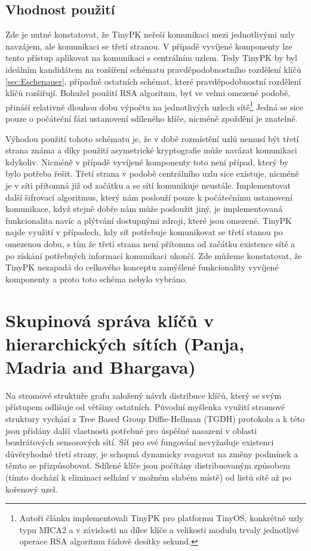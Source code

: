 \documentclass[11pt,final,twoside]{fithesis2}
\begin{document}
\subsection{Vhodnost použití}

Zde je nutné konstatovat, že TinyPK neřeší komunikaci mezi jednotlivými uzly navzájem, ale komunikaci se třetí stranou. V případě vyvíjené 
komponenty lze tento přístup aplikovat na komunikaci s centrálním uzlem. Tedy TinyPK by byl ideálním kandidátem na rozšíření schématu pravděpodobnostního
rozdělení klíčů \ref{sec:Eschenauer}, případně ostatních schémat, které pravděpodobnostní rozdělení klíčů rozšiřují.
Bohužel použití RSA algoritmu, byť ve velmi omezené podobě, přináší relativně dlouhou dobu výpočtu na jednotlivých uzlech sítě\footnote{ 
Autoři článku implementovali TinyPK pro platformu TinyOS, konkrétně uzly typu MICA2 \cite{Inc.} a v závislosti na dílce klíče a velikosti modulu
trvaly jednotlivé operace RSA algoritmu řádově desítky sekund.} Jedná se sice pouze o počáteční fázi ustanovení sdíleného klíče, nicméně zpoždění je znatelné.

Výhodou použití tohoto schématu je, že v době rozmístění uzlů nemusí být třetí strana známa a díky použití asymetrické kryptografie může navázat komunikaci kdykoliv.
Nicméně v případě vyvíjené komponenty toto není případ, který by bylo potřeba řešit. Třetí strana v podobě centrálního uzlu sice existuje, nicméně je v síti přítomná již 
od začátku a se sítí komunikuje neustále. Implementovat další šifrovací algoritmus, který nám poslouží pouze k počátečnímu ustanovení komunikace, když stejně dobře 
nám může posloužit jiný, je implementovaná funkcionalita navíc a plýtvání dostupnými zdroji, které jsou omezené. TinyPK najde využití v případech, kdy síť potřebuje komunikovat
se třetí stanou po omezenou dobu, s tím že třetí strana není přítomna od začátku existence sítě a po získání potřebných informací komunikaci ukončí. Zde můžeme konstatovat, že 
TinyPK nezapadá do celkového konceptu zamýšlené funkcionality vyvíjené komponenty a proto toto schéma nebylo vybráno. 

\section{Skupinová správa klíčů v hierarchických sítích (Panja, Madria and Bhargava)}

Na stromové struktuře grafu založený návrh \cite{Panja2007} distribuce klíčů, který se svým přístupem odlišuje od většiny ostatních. Původní myšlenka využití stromové struktury
vychází z Tree Based Group Diffie-Hellman (TGDH) protokolu \cite{Kim2000} a k této jsou přidány další vlastnosti potřebné pro úspěšné nasazení v oblasti bezdrátových sensorových sítí. 
Síť pro své fungování nevyžaduje existenci důvěryhodné třetí strany, je schopná dynamicky reagovat na změny podmínek a těmto se přizpůsobovat. Sdílené klíče jsou počítány distribuovaným 
způsobem (tímto dochází k eliminaci selhání v možném slabém místě) od listů sítě až po kořenový uzel.  
\end{document}
